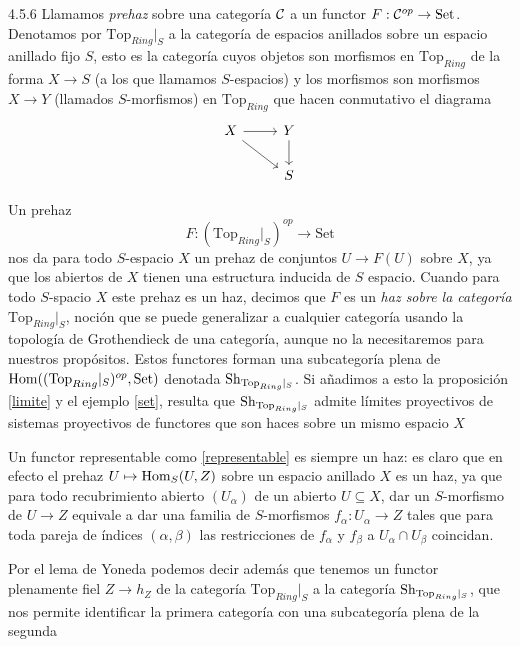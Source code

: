 \documentclass[twoside]{article}
\begin{document}
\begin{remarque}{4.5.6}\label{prehaz}
Llamamos \emph{prehaz} sobre una categoría ${\mathcal C}$ a un functor $F:{\mathcal C}^{op}\to\mathrm{Set}$. Denotamos por $\mathrm{Top}_{Ring}|_S$ a la categoría de espacios anillados sobre un espacio anillado fijo $S$, esto es la categoría cuyos objetos son morfismos en $\mathrm{Top}_{Ring}$ de la forma $X\to S$ (a los que llamamos $S$-espacios) y los morfismos son morfismos $X\to Y$ (llamados $S$-morfismos) en $\mathrm{Top}_{Ring}$ que hacen conmutativo el diagrama
\[
\begin{tikzcd}
X\arrow[r]\arrow[dr] & Y\arrow[d]\\
 & S
\end{tikzcd}
\]

Un prehaz 
\begin{equation}\label{representable}
F:(\mathrm{Top}_{Ring}|_S)^{op}\to\mathrm{Set}
\end{equation}
 nos da para todo $S$-espacio $X$ un prehaz de conjuntos $U\to F(U)$ sobre $X$, ya que los abiertos de $X$ tienen una estructura inducida de $S$ espacio. Cuando para todo $S$-spacio $X$ este prehaz es un haz, decimos que $F$ es un \emph{haz sobre la categoría} $\mathrm{Top}_{Ring}|_S$, noción que se puede generalizar a cualquier categoría usando la topología de Grothendieck de una categoría, aunque no la necesitaremos para nuestros propósitos. Estos functores forman una subcategoría plena de $\operatorname{Hom}((\mathrm{Top}_{Ring}|_S)^{op},\mathrm{Set})$ denotada $\operatorname{Sh}_{\mathrm{Top}_{Ring}|_S}$. Si añadimos a esto la proposición \ref{limite} y el ejemplo \ref{set}, resulta que $\operatorname{Sh}_{\mathrm{Top}_{Ring}|_S}$ admite límites proyectivos de sistemas proyectivos de functores que son haces sobre un mismo espacio $X$  %


Un functor representable como \ref{representable} es siempre un haz: es claro que en efecto el prehaz $U\mapsto\operatorname{Hom}_S(U,Z)$ sobre un espacio anillado $X$ es un haz, ya que para todo recubrimiento abierto $(U_\alpha)$ de un abierto $U\subseteq X$, dar un $S$-morfismo de $U\to Z$ equivale a dar una familia de $S$-morfismos $f_\alpha:U_\alpha\to Z$ tales que para toda pareja de índices $(\alpha,\beta)$ las restricciones de $f_\alpha$ y $f_\beta$ a $U_\alpha\cap U_\beta$ coincidan.

Por el lema de Yoneda podemos decir además que tenemos un functor plenamente fiel $Z\to h_Z$ de la categoría $\mathrm{Top}_{Ring}|_S$ a la categoría $\operatorname{Sh}_{\mathrm{Top}_{Ring}|_S}$, que nos permite identificar la primera categoría con una subcategoría plena de la segunda %


\end{remarque}
\end{document}
